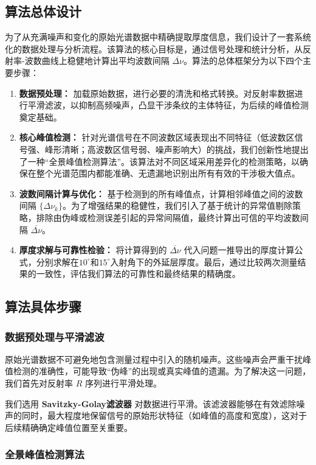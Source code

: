 \documentclass[withoutpreface,bwprint]{cumcmthesis} %
\begin{document}
\subsection{算法总体设计}
为了从充满噪声和变化的原始光谱数据中精确提取厚度信息，我们设计了一套系统化的数据处理与分析流程。该算法的核心目标是，通过信号处理和统计分析，从反射率-波数曲线上稳健地计算出平均波数间隔 $\overline{\Delta\nu}$。算法的总体框架分为以下四个主要步骤：
\begin{enumerate}
    \item \textbf{数据预处理：} 加载原始数据，进行必要的清洗和格式转换。对反射率数据进行平滑滤波，以抑制高频噪声，凸显干涉条纹的主体特征，为后续的峰值检测奠定基础。
    \item \textbf{核心峰值检测：} 针对光谱信号在不同波数区域表现出不同特征（低波数区信号强、峰形清晰；高波数区信号弱、噪声影响大）的挑战，我们创新性地提出了一种“全景峰值检测算法”。该算法对不同区域采用差异化的检测策略，以确保在整个光谱范围内都能准确、无遗漏地识别出所有有效的干涉极大值点。
    \item \textbf{波数间隔计算与优化：} 基于检测到的所有峰值点，计算相邻峰值之间的波数间隔 $\{\Delta\nu_k\}$。为了增强结果的稳健性，我们引入了基于统计的异常值剔除策略，排除由伪峰或检测误差引起的异常间隔值，最终计算出可信的平均波数间隔 $\overline{\Delta\nu}$。
    \item \textbf{厚度求解与可靠性检验：} 将计算得到的 $\overline{\Delta\nu}$ 代入问题一推导出的厚度计算公式，分别求解在$10^\circ$和$15^\circ$入射角下的外延层厚度。最后，通过比较两次测量结果的一致性，评估我们算法的可靠性和最终结果的精确度。
\end{enumerate}

\subsection{算法具体步骤}

\subsubsection{数据预处理与平滑滤波}
原始光谱数据不可避免地包含测量过程中引入的随机噪声。这些噪声会严重干扰峰值检测的准确性，可能导致“伪峰”的出现或真实峰值的遗漏。为了解决这一问题，我们首先对反射率 $R$ 序列进行平滑处理。

我们选用 \textbf{Savitzky-Golay滤波器} 对数据进行平滑。该滤波器能够在有效滤除噪声的同时，最大程度地保留信号的原始形状特征（如峰值的高度和宽度），这对于后续精确确定峰值位置至关重要。


\subsubsection{全景峰值检测算法}
\end{document}
